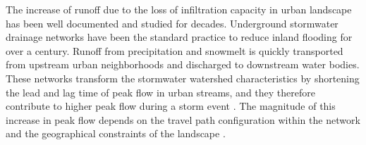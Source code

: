 \documentclass[draft]{agujournal2019}
\begin{document}

The increase of runoff due to the loss of infiltration capacity in urban landscape has been well documented and studied for decades. Underground stormwater drainage networks have been the standard practice to reduce inland flooding for over a century. Runoff from precipitation and snowmelt is quickly transported from upstream urban neighborhoods and discharged to downstream water bodies. These networks transform the stormwater watershed characteristics by shortening the lead and lag time of peak flow in urban streams, and they therefore contribute to higher peak flow during a storm event \cite{Graf1977, Jovanovic2019}. The magnitude of this increase in peak flow depends on the travel path configuration within the network \cite{Seo2012} and the geographical constraints of the landscape \cite{}. 
\end{document}
